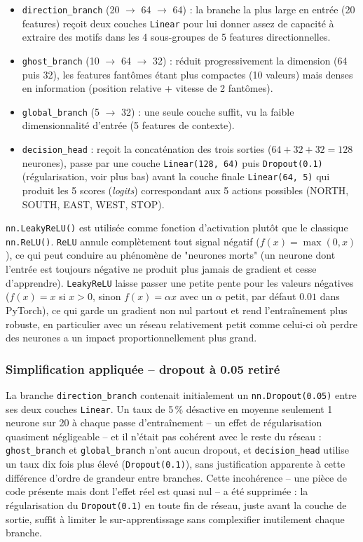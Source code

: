 \documentclass[a4paper,12pt]{article}
\begin{document}
\begin{itemize}
    \item \texttt{direction\_branch} (20 $\to$ 64 $\to$ 64) : la branche
    la plus large en entrée (20 features) reçoit deux couches
    \texttt{Linear} pour lui donner assez de capacité à extraire des
    motifs dans les 4 sous-groupes de 5 features directionnelles.
    \item \texttt{ghost\_branch} (10 $\to$ 64 $\to$ 32) : réduit
    progressivement la dimension (64 puis 32), les features fantômes
    étant plus compactes (10 valeurs) mais denses en information
    (position relative + vitesse de 2 fantômes).
    \item \texttt{global\_branch} (5 $\to$ 32) : une seule couche suffit,
    vu la faible dimensionnalité d'entrée (5 features de contexte).
    \item \texttt{decision\_head} : reçoit la concaténation des trois
    sorties ($64 + 32 + 32 = 128$ neurones), passe par une couche
    \texttt{Linear(128, 64)} puis \texttt{Dropout(0.1)} (régularisation,
    voir plus bas) avant la couche finale \texttt{Linear(64, 5)} qui
    produit les 5 scores (\emph{logits}) correspondant aux 5 actions
    possibles (NORTH, SOUTH, EAST, WEST, STOP).
\end{itemize}

\texttt{nn.LeakyReLU()} est utilisée comme fonction d'activation plutôt
que le classique \texttt{nn.ReLU()}. \texttt{ReLU} annule complètement
tout signal négatif ($f(x) = \max(0, x)$), ce qui peut conduire au
phénomène de "neurones morts" (un neurone dont l'entrée est toujours
négative ne produit plus jamais de gradient et cesse d'apprendre).
\texttt{LeakyReLU} laisse passer une petite pente pour les valeurs
négatives ($f(x) = x$ si $x>0$, sinon $f(x) = \alpha x$ avec un $\alpha$
petit, par défaut $0.01$ dans PyTorch), ce qui garde un gradient non nul
partout et rend l'entraînement plus robuste, en particulier avec un
réseau relativement petit comme celui-ci où perdre des neurones a un
impact proportionnellement plus grand.

\subsubsection{Simplification appliquée -- dropout à 0.05 retiré}
\label{sec:artifice-dropout}

La branche \texttt{direction\_branch} contenait initialement un
\texttt{nn.Dropout(0.05)} entre ses deux couches \texttt{Linear}. Un taux
de 5\,\% désactive en moyenne seulement 1 neurone sur 20 à chaque passe
d'entraînement -- un effet de régularisation quasiment négligeable -- et
il n'était pas cohérent avec le reste du réseau : \texttt{ghost\_branch}
et \texttt{global\_branch} n'ont aucun dropout, et \texttt{decision\_head}
utilise un taux dix fois plus élevé (\texttt{Dropout(0.1)}), sans
justification apparente à cette différence d'ordre de grandeur entre
branches. Cette incohérence -- une pièce de code présente mais dont
l'effet réel est quasi nul -- a été supprimée : la régularisation du
\texttt{Dropout(0.1)} en toute fin de réseau, juste avant la couche de
sortie, suffit à limiter le sur-apprentissage sans complexifier
inutilement chaque branche.
\end{document}
